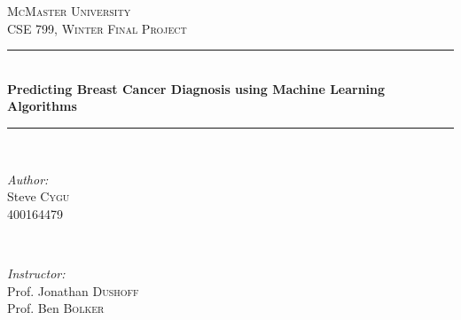 \begin{titlepage}

\newcommand{\HRule}{\rule{\linewidth}{0.5mm}} %

\center %


\textsc{\LARGE McMaster University}\\[1.5cm] %
\textsc{\Large CSE 799, Winter Final Project}\\[0.5cm] %


\HRule \\[0.4cm]
{ \Huge \bfseries Predicting Breast Cancer Diagnosis using  Machine Learning Algorithms}\\[0.4cm] %
\HRule \\[1.5cm]


\begin{minipage}{0.4\textwidth}
\begin{flushleft} \large
\emph{Author:}\\
Steve \textsc{Cygu}\\
400164479 %
\end{flushleft}
\end{minipage}
~
\begin{minipage}{0.4\textwidth}
\begin{flushright} \large
\emph{Instructor:} \\
Prof. Jonathan \textsc{Dushoff}\\ %
Prof. Ben \textsc{Bolker}
\end{flushright}
\end{minipage}\\[2cm]


\end{titlepage}
